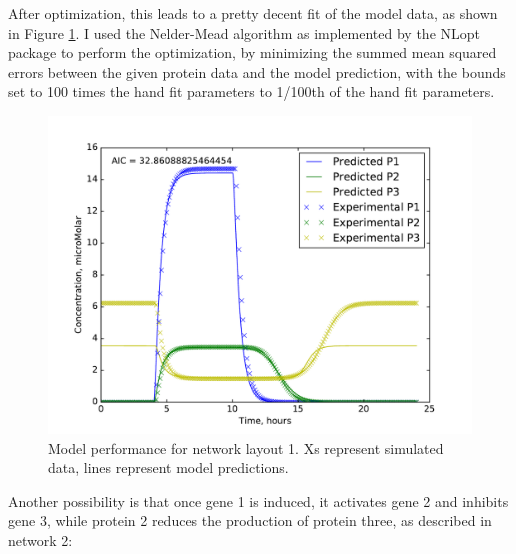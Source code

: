 \documentclass{article}
\begin{document}
After optimization, this leads to a pretty decent fit of the model data, as shown in Figure \ref{fig:P3Layout1}. I used the Nelder-Mead algorithm as implemented by the NLopt package to perform the optimization, by minimizing the summed mean squared errors between the given protein data and the model prediction, with the bounds set to 100 times the hand fit parameters to 1/100th of the hand fit parameters.
\begin{figure}[h!]
\includegraphics[width=12cm]{../Problem3/figures/postNMPlotLayout1}
\caption{Model performance for network layout 1. Xs represent simulated data, lines represent model predictions.}
\label{fig:P3Layout1}
\end{figure}

Another possibility is that once gene 1 is induced, it activates gene 2 and inhibits gene 3, while protein 2 reduces the production of protein three, as described in network 2:\\
\end{document}
